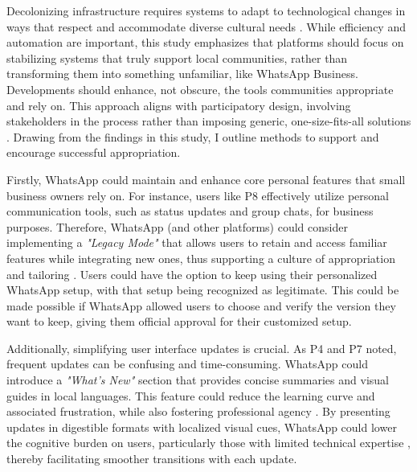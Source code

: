 
Decolonizing infrastructure requires systems to adapt to technological changes in ways that respect and accommodate diverse cultural needs \cite{schaefer2021understanding}. While efficiency and automation are important, this study emphasizes that platforms should focus on stabilizing systems that truly support local communities, rather than transforming them into something unfamiliar, like WhatsApp Business. Developments should enhance, not obscure, the tools communities appropriate and rely on. This approach aligns with participatory design, involving stakeholders in the process rather than imposing generic, one-size-fits-all solutions \cite{herbst2023developing}. Drawing from the findings in this study, I outline methods to support and encourage successful appropriation. 


Firstly, WhatsApp could maintain and enhance core personal features that small business owners rely on. For instance, users like P8 effectively utilize personal communication tools, such as status updates and group chats, for business purposes. Therefore, WhatsApp (and other platforms) could consider implementing a \textit{"Legacy Mode"} that allows users to retain and access familiar features while integrating new ones, thus supporting a culture of appropriation and tailoring \cite{DiSalvo2013, 10.1145/97243.97271}. Users could have the option to keep using their personalized WhatsApp setup, with that setup being recognized as legitimate. This could be made possible if WhatsApp allowed users to choose and verify the version they want to keep, giving them official approval for their customized setup.



Additionally, simplifying user interface updates is crucial. As P4 and P7 noted, frequent updates can be confusing and time-consuming. WhatsApp could introduce a \textit{"What’s New"} section that provides concise summaries and visual guides in local languages. This feature could reduce the learning curve and associated frustration, while also fostering professional agency \cite{10.1145/3274340, 10.1145/97243.97271, wulf2008component}. By presenting updates in digestible formats with localized visual cues, WhatsApp could lower the cognitive burden on users, particularly those with limited technical expertise \cite{oviatt2006human}, thereby facilitating smoother transitions with each update.


